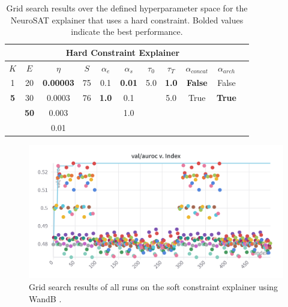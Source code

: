 \begin{table}[h]
    \centering
    \small
    \begin{tabular}{|c|c|c|c|c|c|c|c|c|c|c|}
    \hline
    \multicolumn{10}{|c|}{\textbf{Hard Constraint Explainer}} \\ \hline
    $K$ & $E$ & $\eta$ & $S$ & $\alpha_e$ & $\alpha_s$ & $\tau_0$ & $\tau_T$ & $\alpha_{concat}$ & $\alpha_{arch}$ \\ \hline
    1 & 20 & \textbf{0.00003} & 75 & 0.1 & \textbf{0.01} & 5.0 & \textbf{1.0} & \textbf{False} & False \\
    \textbf{5} & 30 & 0.0003 & 76 & \textbf{1.0} & 0.1 &  & 5.0 & True & \textbf{True} \\
     & \textbf{50} & 0.003 &  &  & 1.0 &  &  &  & \\
     &  & 0.01 &  &  &  &  &  &  & \\ \hline
    \end{tabular}
    \caption[NeuroSAT hard constraint grid search]{Grid search results over the defined hyperparameter space for the NeuroSAT explainer that uses a hard constraint. Bolded values indicate the best performance.}
    \label{tab:sweep_conf_hard}
\end{table}

\begin{figure}
  \includegraphics[width=\linewidth]{img/NeuroSAT-soft_sweep.png}
  \caption[Grid search results of soft constraint explainer]{Grid search results of all runs on the soft constraint explainer using WandB \cite{wandb}.}
  \label{fig:soft-sweep}
\end{figure}

